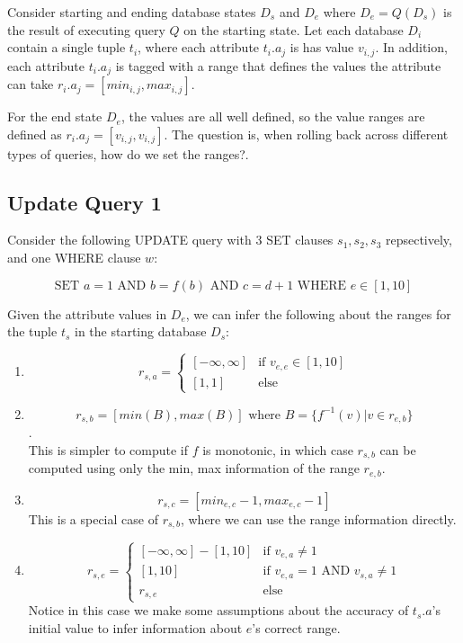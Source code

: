 \documentclass{article}
\begin{document}
Consider starting and ending database states $D_s$ and $D_e$ where
$D_e = Q(D_s)$ is the result of executing query $Q$ on the starting
state.  Let each database $D_i$ contain a single tuple $t_i$, where
each attribute $t_i.a_j$ is has value $v_{i,j}$.  In addition, each
attribute $t_i.a_j$ is tagged with a range that defines the values
the attribute can take $r_i.a_j = [min_{i,j}, max_{i,j}]$.

For the end state $D_e$, the values are all well defined, so the value ranges are
defined as $r_i.a_j = [v_{i,j}, v_{i,j}]$.  The question is, when rolling back
across different types of queries, how do we set the ranges?.

\subsection{Update Query 1}

Consider the following UPDATE query with 3 SET clauses $s_1, s_2, s_3$ repsectively,
and one WHERE clause $w$:

\[
\text{SET } a=1 \text{ AND } b=f(b) \text{ AND } c=d+1 \text{ WHERE } e \in [1, 10] 
\]

Given the attribute values in $D_e$, we can infer the following
about the ranges for the tuple $t_s$ in the starting database $D_s$:

\begin{enumerate}
\item \[r_{s,a} = \begin{cases}
[-\infty, \infty] & \mbox{if } v_{e,e} \in [1, 10]\\
[1, 1]            & \text{else}
\end{cases}\]
\item $$r_{s,b} = [min(B), max(B)] \mbox{ where } B = \{ f^{-1}(v) | v \in r_{e,b} \}$$.\\
      This is simpler to compute if $f$ is monotonic, in which case $r_{s,b}$ can be computed 
      using only the min, max information of the range $r_{e,b}$.
\item $$r_{s,c} = [min_{e,c}-1, max_{e,c}-1]$$
      This is a special case of $r_{s,b}$, where we can use the range information directly.
\item \[r_{s,e} = \begin{cases}
[-\infty, \infty] - [1,10] & \mbox{if } v_{e,a} \ne 1\\
[1,10]                     & \mbox{if } v_{e,a} = 1 \mbox{ AND } v_{s,a} \ne 1\\
r_{s,e}                    & \mbox{else }
\end{cases}
\]
Notice in this case we make some assumptions about the accuracy of $t_s.a$'s initial value to infer
information about $e$'s correct range.
\end{enumerate}
\end{document}

